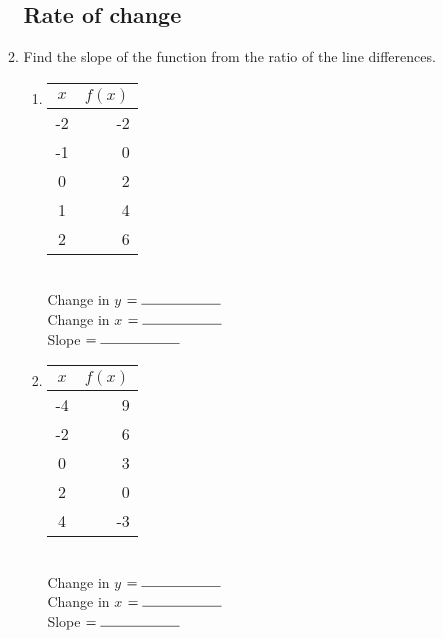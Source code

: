 \documentclass[12pt, twoside]{article}
\begin{document}
\begin{enumerate}
\begin{enumerate}
\newpage

\subsection*{Rate of change}

\item Find the slope of the function from the ratio of the line differences.

  \begin{multicols}{2}
  \begin{enumerate}
    \item
      \begin{tabular}{|c|r|}
      \hline
      $x$ & $f(x)$\\
      \hline
      -2 & -2 \\
      \hline
      -1 & 0 \\
      \hline
      0 & 2 \\
      \hline
      1 & 4 \\
      \hline
      2 & 6 \\
      \hline
      \end{tabular}\\[0.85cm]

      Change in $y$ $= \rule{2cm}{0.15mm}$ \\[0.5cm]
      Change in $x$ $= \rule{2cm}{0.15mm}$ \\[0.5cm]
      Slope $= \rule{2cm}{0.15mm}$\\


    \item
      \begin{tabular}{|c|r|}
      \hline
      $x$ & $f(x)$\\
      \hline
      -4 & 9 \\
      \hline
      -2 & 6 \\
      \hline
      0 & 3 \\
      \hline
      2 & 0 \\
      \hline
      4 & -3 \\
      \hline
      \end{tabular}\\[0.85cm]

      Change in $y$ $= \rule{2cm}{0.15mm}$ \\[0.5cm]
      Change in $x$ $= \rule{2cm}{0.15mm}$ \\[0.5cm]
      Slope $= \rule{2cm}{0.15mm}$\\


    \end{enumerate}
    \end{multicols}


\end{enumerate}
\end{enumerate}
\end{document}
